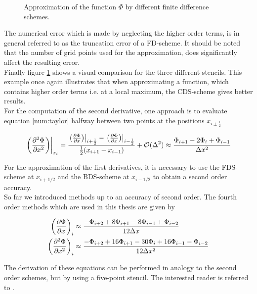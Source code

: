 \begin{figure}[!btp]
  \centering
  \caption{Approximation of the function $\Phi$ by different finite difference schemes.}
  \label{num:fd_image}
\end{figure}

The numerical error which is made by neglecting the higher order terms, is in general referred to as the truncation error of a FD-scheme.
It should be noted that the number of grid points used for the approximation, does significantly affect the resulting error.\\
Finally figure \ref{num:fd_image} shows a visual comparison for the three different stencils.
This example once again illustrates that when approximating a function, which contains higher order terms i.e. at a local maximum,
the  CDS-scheme gives better results.\\
For the computation of the second derivative, one approach is to evaluate equation \ref{num:taylor} halfway between two points at the positions $x_{i\pm\frac{1}{2}}$

\begin{align}
    \left.\left(\pdn[^2\Phi]{x^2}\right)\right|_{x_i} =
     \frac{\left.\left(\pdn[\Phi]{x}\right)\right|_{i+\frac{1}{2}}-
     \left.\left(\pdn[\Phi]{x}\right)\right|_{i-\frac{1}{2}}}
    {\frac{1}{2}(x_{i+1} - x_{i-1})} + \mathcal{O}(\Delta ^2)  \approx
    \frac{\Phi_{i+1} - 2\Phi_i + \Phi_{i-1}}{\Delta x^2}
\end{align}

For the approximation of the first derivatives, it is necessary to use the FDS-scheme at $x_{i+1/2}$ and the BDS-scheme at $x_{i-1/2}$ to obtain
a second order accuracy.\\
So far we introduced methods up to an accuracy of second order. The fourth order methods which are used in this thesis are given by

\begin{align}
    \left(\pdn[\Phi]{x}\right)_i &\approx \frac{-\Phi_{i+2} + 8\Phi_{i+1} - 8\Phi_{i-1} + \Phi_{i-2}}{12\Delta x} \\
    \left(\pdn[^2\Phi]{x^2}\right)_i &\approx \frac{-\Phi_{i+2} + 16\Phi_{i+1} -30\Phi_i + 16\Phi_{i-1} - \Phi_{i-2}}{12\Delta x^2} \\
\end{align}

The derivation of these equations can be performed in analogy to the second order schemes, but by using a five-point
stencil. The interested reader is referred to \citep{Fornberg1988}.

